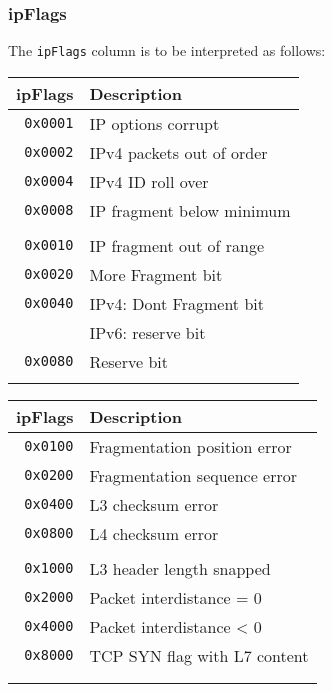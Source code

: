 \documentclass[documentation]{subfiles}
\begin{document}
\subsubsection{ipFlags}\label{ipFlags}
The {\tt ipFlags} column is to be interpreted as follows:\\
\begin{minipage}{.45\textwidth}
    \begin{longtable}{rl}
        \toprule
        {\bf ipFlags} & {\bf Description}\\
        \midrule\endhead%
        {\tt 0x0001} & IP options corrupt\\
        {\tt 0x0002} & IPv4 packets out of order\\
        {\tt 0x0004} & IPv4 ID roll over\\
        {\tt 0x0008} & IP fragment below minimum\\\\
        {\tt 0x0010} & IP fragment out of range\\
        {\tt 0x0020} & More Fragment bit\\
        {\tt 0x0040} & IPv4: Dont Fragment bit\\
                     & IPv6: reserve bit\\
        {\tt 0x0080} & Reserve bit\\
        &\\
        \bottomrule
    \end{longtable}
\end{minipage}
\hfill
\begin{minipage}{.45\textwidth}
    \begin{longtable}{rl}
        \toprule
        {\bf ipFlags} & {\bf Description}\\
        \midrule\endhead%
        {\tt 0x0100} & Fragmentation position error\\
        {\tt 0x0200} & Fragmentation sequence error\\
        {\tt 0x0400} & L3 checksum error\\
        {\tt 0x0800} & L4 checksum error\\\\
        {\tt 0x1000} & L3 header length snapped\\
        {\tt 0x2000} & Packet interdistance = 0\\
        {\tt 0x4000} & Packet interdistance < 0\\
        {\tt 0x8000} & TCP SYN flag with L7 content\\\\\\
        \bottomrule
    \end{longtable}
\end{minipage}
\end{document}
